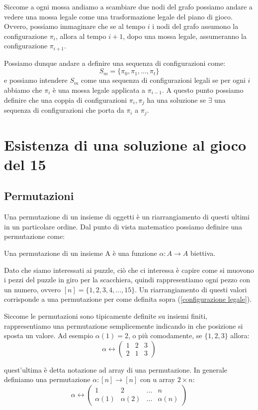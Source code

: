 Siccome a ogni mossa andiamo a scambiare due nodi del grafo possiamo andare a vedere una mossa legale come una trasformazione legale del piano di gioco.
Ovvero, possiamo immaginare che se al tempo $i$ i nodi del grafo assumono la configurazione $\pi_i$, allora al tempo $i+1$, dopo una mossa legale, assumeranno la configurazione $\pi_{i+1}$.

Possiamo dunque andare a definire una sequenza di configurazioni come:
$$
S_m = \{\pi_0, \pi_1,...,\pi_t\}
$$
e possiamo intendere $S_m$ come una sequenza di configurazioni legali se per ogni $i$ abbiamo che $\pi_i$ è una mossa legale applicata a $\pi_{i-1}$.
A questo punto possiamo definire che una coppia di configurazioni $\pi_i, \pi_j$ ha una soluzione se $\exists$ una sequenza di configurazioni che porta da $\pi_i$ a $\pi_j$.

\section{Esistenza di una soluzione al gioco del 15}
\subsection{Permutazioni ~\cite{8}}
\label{permutazioni}
Una permutazione di un insieme di oggetti è un riarrangiamento di questi ultimi in un particolare ordine. 
Dal punto di vista matematico possiamo definire una permutazione come:
\begin{definition}
    Una permutazione di un insieme A è una funzione $\alpha: A \rightarrow A$ biettiva. 
\end{definition}
Dato che siamo interessati ai puzzle, ciò che ci interessa è capire come si muovono i pezzi del puzzle in giro per la scacchiera, quindi rappresentiamo ogni pezzo con un numero, ovvero $[n] = \{1,2,3,4,...,15\}$.
Un riarrangiamento di questi valori corrisponde a una permutazione per come definita sopra (\ref{configurazione legale}). 

Siccome le permutazioni sono tipicamente definite su insiemi finiti, rappresentiamo una permutazione semplicemente indicando in che posizione si sposta un valore. Ad esempio $\alpha(1)=2$, o più comodamente, se $\{1,2,3\}$ allora:
$$
\alpha \leftrightarrow 
  \begin{pmatrix}
    1 & 2 & 3 \\
    2 & 1 & 3
  \end{pmatrix}
$$

quest'ultima è detta notazione ad array di una permutazione. 
In generale definiamo una permutazione $\alpha: [n] \rightarrow [n]$ con u array $2\times n$: 
$$
\alpha \leftrightarrow 
  \begin{pmatrix}
    1 & 2 & ... & n \\
    \alpha(1) & \alpha(2) & ... & \alpha(n)
  \end{pmatrix}
$$

